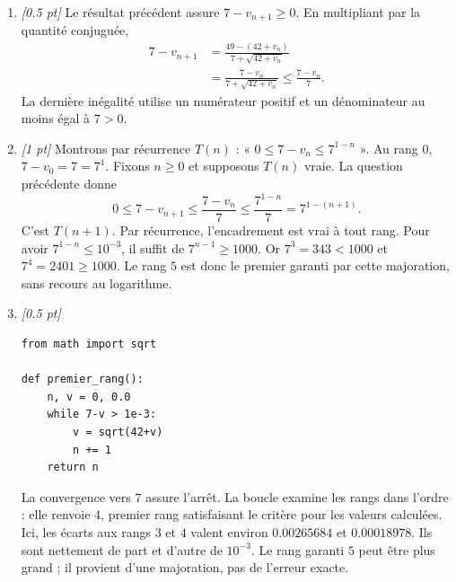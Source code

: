 \begin{enumerate}
\item \textit{[\num{0,5} pt]} Le résultat précédent assure $7-v_{n+1}\ge0$. En multipliant par la quantité conjuguée,
\[\begin{aligned}7-v_{n+1}&=\frac{49-(42+v_n)}{7+\sqrt{42+v_n}}\\&=\frac{7-v_n}{7+\sqrt{42+v_n}}\le\frac{7-v_n}{7}.\end{aligned}\]
La dernière inégalité utilise un numérateur positif et un dénominateur au moins égal à $7>0$.

\item \textit{[1 pt]} Montrons par récurrence $T(n)$ : « $0\le 7-v_n\le 7^{1-n}$ ».
Au rang $0$, $7-v_0=7=7^1$. Fixons $n\ge0$ et supposons $T(n)$ vraie. La question précédente donne
\[0\le 7-v_{n+1}\le\frac{7-v_n}{7}\le\frac{7^{1-n}}{7}=7^{1-(n+1)}.\]
C'est $T(n+1)$. Par récurrence, l'encadrement est vrai à tout rang.
Pour avoir $7^{1-n}\le10^{-3}$, il suffit de $7^{n-1}\ge1000$.
Or $7^{3}=343<1000$ et $7^{4}=2401\ge1000$. Le rang $5$ est donc le premier garanti par cette majoration, sans recours au logarithme.


\item \textit{[\num{0,5} pt]} 
\begin{lstlisting}
from math import sqrt

def premier_rang():
    n, v = 0, 0.0
    while 7-v > 1e-3:
        v = sqrt(42+v)
        n += 1
    return n
\end{lstlisting}
La convergence vers $7$ assure l'arrêt. La boucle examine les rangs dans l'ordre : elle renvoie $4$, premier rang satisfaisant le critère pour les valeurs calculées. Ici, les écarts aux rangs $3$ et $4$ valent environ $\num{0,00265684}$ et $\num{0,00018978}$. Ils sont nettement de part et d'autre de $10^{-3}$. Le rang garanti $5$ peut être plus grand ; il provient d'une majoration, pas de l'erreur exacte.

\end{enumerate}

